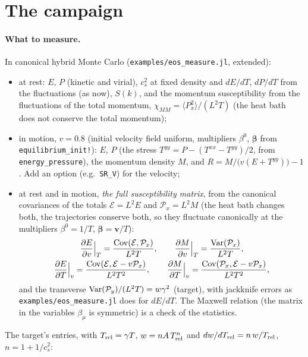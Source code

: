 \documentclass[11pt,aps,preprint,nofootinbib,superscriptaddress,tightenlines]{revtex4-2}
\newcommand{\avg}[1]{\langle #1\rangle}
\def\st{\begin{equation}}
\def\stp{\end{equation}}
\let\oldparagraph\paragraph
\renewcommand{\paragraph}{\par\bigskip\oldparagraph}
\begin{document}
\section{The campaign}
\label{sec:campaign}

\paragraph{What to measure.}  In canonical hybrid Monte Carlo (\nolinkurl{examples/eos_measure.jl}, extended):
\begin{itemize}
\item at rest: $E$, $P$ (kinetic and virial), $c_s^2$ at fixed density and $dE/dT$, $dP/dT$ from the fluctuations (as now), $S(k)$, and the momentum
  susceptibility from the fluctuations of the total momentum, $\chi_{MM}=\avg{P_x^2}/(L^2T)$ (the heat bath does not conserve the total momentum);
\item in motion, $v=0.8$ (initial velocity field uniform, multipliers $\beta^0$, $\bm\beta$ from \texttt{equilibrium\_init!}): $E$, $P$ (the stress
  $T^{yy}=P-(T^{xx}-T^{yy})/2$, from \texttt{energy\_pressure}), the momentum density $M$, and $R=M/\big(v(E+T^{yy})\big)-1$.  Add an option (e.g.\ \texttt{SR\_V})
  for the velocity;
\item at rest and in motion, \emph{the full susceptibility matrix}, from the canonical covariances of the totals $\mathcal E=L^2E$ and $\mathcal P_x=L^2M$
  (the heat bath changes both, the trajectories conserve both, so they fluctuate canonically at the multipliers $\beta^0=1/T$, $\bm\beta=\bm v/T$):
  \st
  \begin{gathered}
  \frac{\partial E}{\partial v}\Big|_T=\frac{{\rm Cov}(\mathcal E,\mathcal P_x)}{L^2T},\qquad \frac{\partial M}{\partial v}\Big|_T=\frac{{\rm Var}(\mathcal P_x)}{L^2T},\\
  \frac{\partial E}{\partial T}\Big|_v=\frac{{\rm Cov}(\mathcal E,\mathcal E-v\mathcal P_x)}{L^2T^2},\qquad \frac{\partial M}{\partial T}\Big|_v=\frac{{\rm Cov}(\mathcal P_x,\mathcal E-v\mathcal P_x)}{L^2T^2} ,
  \end{gathered}
  \label{chifluct}
  \stp
  and the transverse ${\rm Var}(\mathcal P_y)/(L^2T)=w\gamma^2$ (target), with jackknife errors as \nolinkurl{examples/eos_measure.jl} does for $dE/dT$.  The Maxwell
  relation (the matrix in the variables $\beta_\mu$ is symmetric) is a check of the statistics.
\end{itemize}
The target's entries, with $T_{\rm rel}=\gamma T$, $w=nA\,T_{\rm rel}^n$ and $dw/dT_{\rm rel}=n\,w/T_{\rm rel}$, $n=1+1/c_s^2$:
\end{document}
